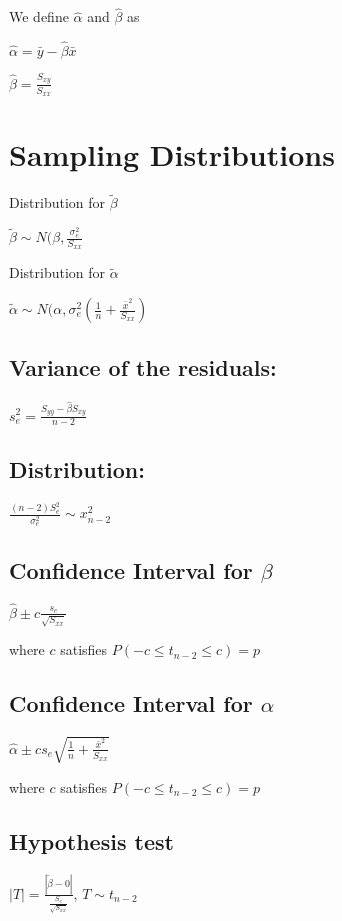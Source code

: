     We define $\hat{\alpha}$ and $\hat{\beta}$ as
    \begin{center}$ \hat{\alpha} = \bar{y} - \hat{\beta} \bar{x} $\end{center}
    \begin{center}$ \hat{\beta} = \frac{S_{xy}}{S_{xx}} $\end{center}

  \section{Sampling Distributions}
    Distribution for $\widetilde{\beta}$
    \begin{center}$ \widetilde{\beta} \sim N(\beta, \frac{\sigma^2_e}{S_{xx}} $\end{center}
    Distribution for $\widetilde{\alpha}$
    \begin{center}$ \widetilde{\alpha} \sim N(\alpha, \sigma^2_e (\frac{1}{n} + \frac{\bar{x}^2}{S_{xx}})$\end{center}
    \subsection{Variance of the residuals:}
    \begin{center}$s^2_e = \frac{S_{yy} - \hat{\beta} S_{xy}}{n-2}$\end{center}
    \subsection{Distribution:}
    \begin{center}$ \frac{(n-2)S^2_e}{\sigma^2_e} \sim x^2_{n-2} $\end{center}

    \subsection{Confidence Interval for $\beta$}
    \begin{center}$\hat{\beta} \pm c\frac{s_e}{\sqrt{S_{xx}}}$\end{center}
    where $c$ satisfies $P(-c \leq t_{n-2} \leq c) = p$

    \subsection{Confidence Interval for $\alpha$}
    \begin{center}$\hat{\alpha} \pm cs_e \sqrt{ \frac{1}{n} + \frac{\bar{x}^2}{S_{xx}}}$\end{center}
    where $c$ satisfies $P(-c \leq t_{n-2} \leq c) = p$

    \subsection{Hypothesis test}
    $|T| = \frac{ | \widetilde{\beta} - 0 | }{ \frac{S_e}{\sqrt{S_{xx}}} } $, $T \sim t_{n-2}$
